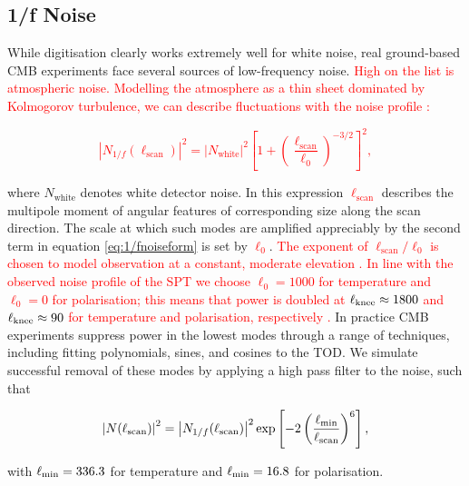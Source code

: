 \documentclass[apj]{emulateapj}
\newcommand{\lknee}{\ensuremath{\ell_{\rm knee}}}
\newcommand{\lcut}{\ensuremath{\ell_{\rm min}}}
\newcommand{\changed}[1]{\textcolor{Red}{#1}}
\begin{document}
\subsection{1/f Noise}
\label{subsec:oofnoise}

While digitisation clearly works extremely well for white noise, real ground-based CMB experiments face several sources of low-frequency noise. \changed{High on the list is atmospheric noise. Modelling the atmosphere as a thin sheet dominated by Kolmogorov turbulence, we can describe fluctuations with the noise profile \citep{lay2000}:}

\changed{
\begin{equation} \label{eq:1/fnoiseform}
\left| N_{1/f}(\ell_{\mathrm{scan}}) \right|^2 = \left| N_{\mathrm{white}} \right|^2 \left[ 1 + \left( \frac{\ell_{\mathrm{scan}}}{\ell_0} \right)^{-3/2} \right]^2,
\end{equation}
}


where $N_{\mathrm{white}}$ denotes white detector noise. In this expression \changed{$\ell_{\mathrm{scan}}$} describes the multipole moment of angular features of corresponding size along the scan direction. The scale at which such modes are amplified appreciably by the second term in equation \ref{eq:1/fnoiseform} is set by \changed{$\ell_0$}. \changed{The exponent of $\ell_{\mathrm{scan}}/\ell_0$ is chosen to model observation at a constant, moderate elevation \citep{lay1997}. In line with the observed noise profile of the SPT we choose $\ell_0 = 1000$ for temperature and $\ell_0 = 0$ for polarisation; this means that power is doubled at $\lknee \approx 1800$ and $\lknee \approx 90$ for temperature and polarisation, respectively \citep{henning2018}.} In practice CMB experiments suppress power in the lowest modes through a range of techniques, including fitting polynomials, sines, and cosines to the TOD. We simulate successful removal of these modes by applying a high pass filter to the noise, such that

\changed{
\begin{equation} \label{eq:1/fnoiseformfinal}
\left| N (\ell_{\mathrm{scan}}) \right|^2 = \left| N_{1/f}(\ell_{\mathrm{scan}}) \right|^2 \exp\left[ -2\left( \frac{\lcut}{\ell_{\mathrm{scan}}} \right)^{6} \right],
\end{equation}
}

with $\lcut = 336.3$ for temperature and $\lcut = 16.8$ for polarisation.
\end{document}
